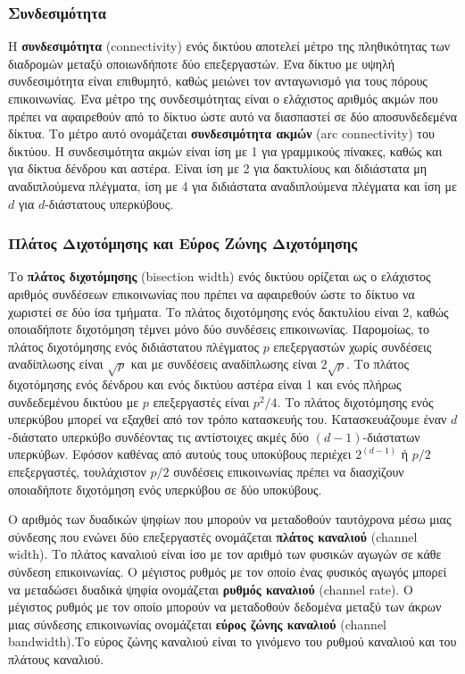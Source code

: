 \documentclass[12pt,a4paper]{article} %
\begin{document}
\subsubsection*{Συνδεσιμότητα}
Η \textbf{συνδεσιμότητα} (connectivity) ενός 
δικτύου αποτελεί μέτρο της πληθικότητας των διαδρομών μεταξύ οποιωνδήποτε 
δύο επεξεργαστών. Ένα δίκτυο με υψηλή συνδεσιμότητα είναι επιθυμητό, 
καθώς μειώνει τον ανταγωνισμό για τους πόρους επικοινωνίας. Ένα μέτρο της 
συνδεσιμότητας είναι ο ελάχιστος αριθμός ακμών που πρέπει να αφαιρεθούν 
από το δίκτυο ώστε αυτό να διασπαστεί σε δύο αποσυνδεδεμένα δίκτυα. Το 
μέτρο αυτό ονομάζεται \textbf{συνδεσιμότητα ακμών} (arc connectivity) 
του δικτύου. Η συνδεσιμότητα ακμών είναι ίση με 1 για γραμμικούς πίνακες, 
καθώς και για δίκτυα δένδρου και αστέρα. Είναι ίση με 2 για δακτυλίους
και διδιάστατα μη αναδιπλούμενα πλέγματα, ίση με 4 για διδιάστατα αναδιπλούμενα 
πλέγματα και ίση με $d$ για $d$-διάστατους υπερκύβους.

\subsubsection*{Πλάτος Διχοτόμησης και Εύρος Ζώνης Διχοτόμησης}
Το \textbf{πλάτος διχοτόμησης} (bisection width) 
ενός δικτύου ορίζεται ως ο ελάχιστος αριθμός συνδέσεων επικοινωνίας που 
πρέπει να αφαιρεθούν ώστε το δίκτυο να χωριστεί σε δύο ίσα τμήματα. Το 
πλάτος διχοτόμησης ενός δακτυλίου είναι 2, καθώς οποιαδήποτε διχοτόμηση
τέμνει μόνο δύο συνδέσεις επικοινωνίας. Παρομοίως, το πλάτος διχοτόμησης 
ενός διδιάστατου πλέγματος $p$ επεξεργαστών χωρίς συνδέσεις αναδίπλωσης είναι
$\sqrt{p}$ και με συνδέσεις αναδίπλωσης είναι $2\sqrt{p}$. Το πλάτος 
διχοτόμησης ενός δένδρου και ενός δικτύου αστέρα είναι 1 και ενός
πλήρως συνδεδεμένου δικτύου με $p$ επεξεργαστές είναι $p^2/4$. Το πλάτος 
διχοτόμησης ενός υπερκύβου μπορεί να εξαχθεί από τον τρόπο κατασκευής του.
Κατασκευάζουμε έναν $d$-διάστατο υπερκύβο συνδέοντας τις αντίστοιχες ακμές 
δύο $(d-1)$-διάστατων υπερκύβων. Εφόσον καθένας από αυτούς τους υποκύβους 
περιέχει $2^{(d-1)}$ ή $p/2$ επεξεργαστές, τουλάχιστον $p/2$ συνδέσεις 
επικοινωνίας πρέπει να διασχίζουν οποιαδήποτε διχοτόμηση ενός υπερκύβου 
σε δύο υποκύβους.

Ο αριθμός των δυαδικών ψηφίων που μπορούν να μεταδοθούν ταυτόχρονα μέσω 
μιας σύνδεσης που ενώνει δύο επεξεργαστές ονομάζεται \textbf{πλάτος καναλιού} 
(channel width). Το πλάτος καναλιού είναι ίσο με
τον αριθμό των φυσικών αγωγών σε κάθε σύνδεση επικοινωνίας. Ο μέγιστος 
ρυθμός με τον οποίο ένας φυσικός αγωγός μπορεί να μεταδώσει δυαδικά
ψηφία ονομάζεται \textbf{ρυθμός καναλιού} (channel rate).
Ο μέγιστος ρυθμός με τον οποίο μπορούν να μεταδοθούν δεδομένα μεταξύ των 
άκρων μιας σύνδεσης επικοινωνίας ονομάζεται \textbf{εύρος ζώνης καναλιού}
(channel bandwidth).Το εύρος ζώνης καναλιού 
είναι το γινόμενο του ρυθμού καναλιού και του πλάτους καναλιού.
\end{document}
